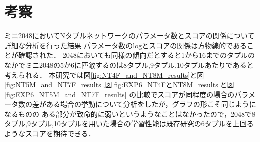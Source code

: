 \section{考察}
\label{sec:consideration}
ミニ2048においてNタプルネットワークのパラメータ数とスコアの関係について詳細な分析を行った結果
パラメータ数のlogとスコアの関係は方物線的であることが確認された．
2048においても同様の傾向だとすると1から16までのタプルのなかでミニ2048の5か6に匹敵するのは8タプル,9タプル,10タプルあたりであると考えられる．
本研究では図\ref{fig:NT4F_and_NT8M_results}と図\ref{fig:NT5M_and_NT7F_results},図\ref{fig:EXP6_NT4FとNT8M_results}と図\ref{fig:EXP6_NT5M_and_NT7F_results}
の比較でスコアが同程度の場合のパラメータ数の差がある場合の挙動について分析をしたが，グラフの形こそ同じようになるものの
ある部分が致命的に弱いというようなことはなかったので，2048で8タプル,9タプル,10タプルを用いた場合の学習性能は既存研究の6タプルを上回るようなスコアを期待できる．